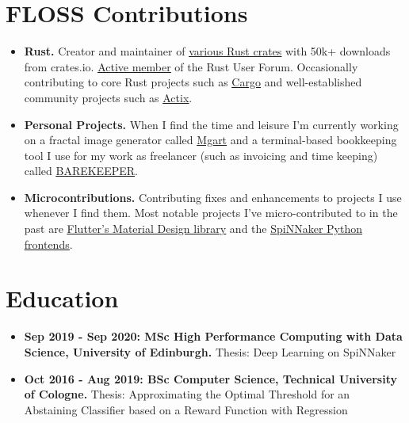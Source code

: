 \documentclass[10pt]{article}
\begin{document}
\section*{FLOSS Contributions}

\begin{itemize}[label={}, leftmargin=*]

\item \textbf{Rust.} Creator and maintainer of
  \underline{\href{https://crates.io/users/jofas}{various Rust crates}}
  with 50k+ downloads from crates.io.
  \underline{\href{https://users.rust-lang.org/u/jofas/summary}{Active member}}
  of the Rust User Forum.
  Occasionally contributing to core Rust projects such as
  \underline{\href{https://github.com/rust-lang/cargo}{Cargo}} and
  well-established community projects such as
  \underline{\href{https://github.com/actix/}{Actix}}.

\item \textbf{Personal Projects.} When I find the time and leisure I'm
  currently working on a fractal image generator called
  \underline{\href{https://github.com/jofas/mgart}{Mgart}}
  and a terminal-based bookkeeping tool I use for my work as
  freelancer (such as invoicing and time keeping) called
  \underline{\href{https://github.com/jofas/BAREKEEPER}{BAREKEEPER}}.

\item \textbf{Microcontributions.} Contributing fixes and enhancements
  to projects I use whenever I find them.
  Most notable projects I've micro-contributed to in the past are
  \underline{\href{https://github.com/flutter/flutter}{Flutter's Material Design library}}
  and the
  \underline{\href{https://github.com/SpiNNakerManchester}{SpiNNaker Python frontends}}.

\end{itemize}

\section*{Education}

\begin{itemize}[label={}, leftmargin=*]

\item \textbf{Sep 2019 - Sep 2020: MSc High Performance Computing with Data
  Science, University of Edinburgh.} Thesis: Deep Learning on SpiNNaker

\item \textbf{Oct 2016 - Aug 2019: BSc Computer Science, Technical
  University of Cologne.} Thesis: Approximating the Optimal Threshold
  for an Abstaining Classifier based on a Reward Function with Regression

\end{itemize}
\end{document}
